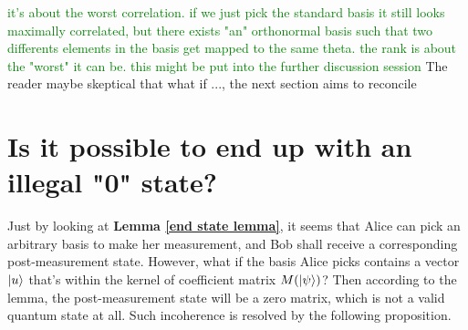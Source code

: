 \begin{example}

\end{example}
\textcolor{green}{it's about the worst correlation. if we just pick the standard basis it still looks maximally correlated, but there exists "an" orthonormal basis such that two differents elements in the basis get mapped to the same theta. the rank is about the "worst" it can be. this might be put into the further discussion session}
The reader maybe skeptical that what if ..., the next section aims to reconcile 



\section{Is it possible to end up with an illegal "0" state?}
Just by looking at \textbf{Lemma \ref{end state lemma}}, it seems that Alice can pick an arbitrary basis to make her measurement, and Bob shall receive a corresponding post-measurement state. However, what if the basis Alice picks contains a vector $\ket{u}$ that's within the kernel of coefficient matrix $M(\ket{\psi})$? Then according to the lemma, the post-measurement state will be a zero matrix, which is not a valid quantum state at all. Such incoherence is resolved by the following proposition.

